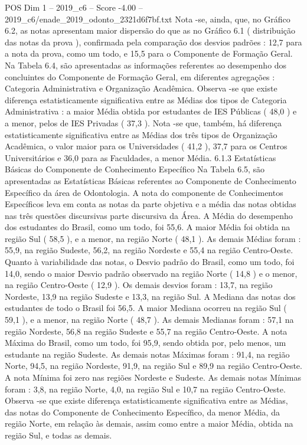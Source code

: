 \begin{textsample}{POS Dim 1 – 2019\_c6 – Score -4.00 – 2019\_c6/enade\_2019\_odonto\_2321d6f7bf.txt}
Nota -se, ainda, que, no Gráfico 6.2, as notas apresentam maior dispersão do que as no Gráfico 6.1 ( distribuição das notas da prova ), confirmada pela comparação dos desvios padrões : 12,7 para a nota da prova, como um todo, e 15,5 para o Componente de Formação Geral.
Na Tabela 6.4, são apresentadas as informações referentes ao desempenho dos concluintes do Componente de Formação Geral, em diferentes agregações : Categoria Administrativa e Organização Acadêmica.
Observa -se que existe diferença estatisticamente significativa entre as Médias dos tipos de Categoria Administrativa : a maior Média obtida por estudantes de IES Públicas ( 48,0 ) e a menor, pelos de IES Privadas ( 37,3 ).
Nota -se que, também, há diferença estatisticamente significativa entre as Médias dos três tipos de Organização Acadêmica, o valor maior para os Universidades ( 41,2 ), 37,7 para os Centros Universitários e 36,0 para as Faculdades, a menor Média. 6.1.3 Estatísticas Básicas do Componente de Conhecimento Específico Na Tabela 6.5, são apresentadas as Estatísticas Básicas referentes ao Componente de Conhecimento Específico da área de Odontologia.
A nota do componente de Conhecimentos Específicos leva em conta as notas da parte objetiva e a média das notas obtidas nas três questões discursivas parte discursiva da Área.
A Média do desempenho dos estudantes do Brasil, como um todo, foi 55,6.
A maior Média foi obtida na região Sul ( 58,5 ), e a menor, na região Norte ( 48,1 ).
As demais Médias foram : 55,9, na região Sudeste, 56,2, na região Nordeste e 55,4 na região Centro-Oeste.
Quanto à variabilidade das notas, o Desvio padrão do Brasil, como um todo, foi 14,0, sendo o maior Desvio padrão observado na região Norte ( 14,8 ) e o menor, na região Centro-Oeste ( 12,9 ).
Os demais desvios foram : 13,7, na região Nordeste, 13,9 na região Sudeste e 13,3, na região Sul.
A Mediana das notas dos estudantes de todo o Brasil foi 56,5.
A maior Mediana ocorreu na região Sul ( 59,1 ), e a menor, na região Norte ( 48,7 ).
As demais Medianas foram : 57,1 na região Nordeste, 56,8 na região Sudeste e 55,7 na região Centro-Oeste.
A nota Máxima do Brasil, como um todo, foi 95,9, sendo obtida por, pelo menos, um estudante na região Sudeste.
As demais notas Máximas foram : 91,4, na região Norte, 94,5, na região Nordeste, 91,9, na região Sul e 89,9 na região Centro-Oeste.
A nota Mínima foi zero nas regiões Nordeste e Sudeste.
As demais notas Mínimas foram : 3,8, na região Norte, 4,0, na região Sul e 10,7 na região Centro-Oeste.
Observa -se que existe diferença estatisticamente significativa entre as Médias, das notas do Componente de Conhecimento Específico, da menor Média, da região Norte, em relação às demais, assim como entre a maior Média, obtida na região Sul, e todas as demais.

\end{textsample}
